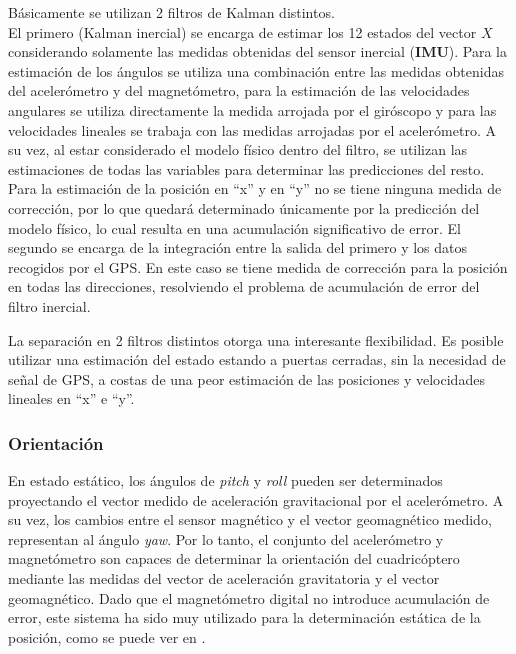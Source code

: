 \documentclass[main]{subfiles}
\begin{document}
Básicamente se utilizan 2 filtros de Kalman distintos.\\
El primero (Kalman inercial) se encarga de estimar los 12 estados del vector $X$ considerando solamente las medidas obtenidas del sensor inercial (\textbf{IMU}). Para la estimación de los ángulos se utiliza una combinación entre las medidas obtenidas del acelerómetro y del magnetómetro, para la estimación de las velocidades angulares se utiliza directamente la medida arrojada por el giróscopo y para las velocidades lineales se trabaja con las medidas arrojadas por el acelerómetro. A su vez, al estar considerado el modelo físico dentro del filtro, se utilizan las estimaciones de todas las variables para determinar las predicciones del resto. Para la estimación de la posición en ``x'' y en ``y'' no se tiene ninguna medida de corrección, por lo que quedará determinado únicamente por la predicción del modelo físico, lo cual resulta en una acumulación significativo de error.
El segundo se encarga de la integración entre la salida del primero y los datos recogidos por el GPS. En este caso se tiene medida de corrección para la posición en todas las direcciones, resolviendo el problema de acumulación de error del filtro inercial.


La separación en 2 filtros distintos otorga una interesante flexibilidad. Es posible utilizar una estimación del estado estando a puertas cerradas, sin la necesidad de señal de GPS, a costas de una peor estimación de las posiciones y velocidades lineales en ``x'' e ``y''.

\subsubsection*{Orientación}

En estado estático, los ángulos de \emph{pitch} y \emph{roll} pueden ser determinados proyectando el vector medido de aceleración gravitacional por el acelerómetro. A su vez, los cambios entre el sensor magnético y el vector geomagnético medido, representan al ángulo \emph{yaw}. Por lo tanto, el conjunto del acelerómetro y magnetómetro son capaces de determinar la orientación del cuadricóptero mediante las medidas del vector de aceleración gravitatoria y el vector geomagnético. Dado que el magnetómetro digital no introduce acumulación de error, este sistema ha sido muy utilizado para la determinación estática de la posición, como se puede ver en \cite{bib:euler_magneto_acc}.

\end{document}
